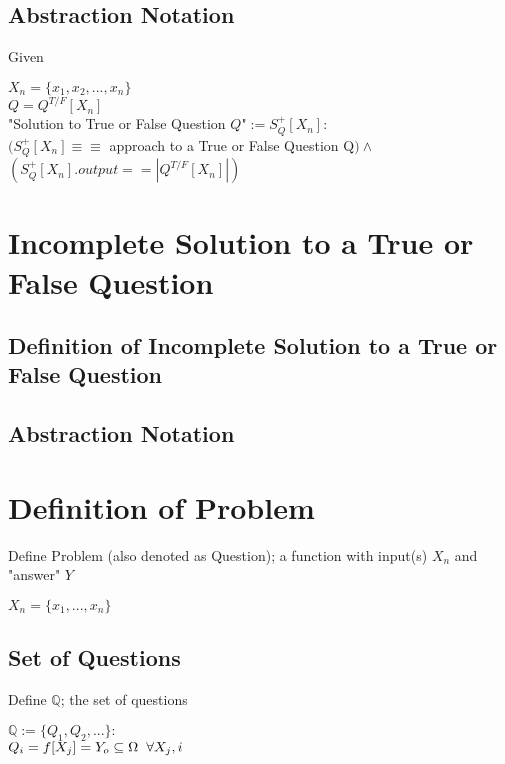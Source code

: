 \documentclass[11pt]{article}
\begin{document}
\subsection{Abstraction Notation}
Given
\begin{center}
$
X_n = \{x_1,x_2,...,x_n\}
$
\\ \vspace{2mm}
$
Q = Q^{T/F}[X_n]
$
\\ \vspace{6mm}
"Solution to True or False Question $Q$"$ := S^+_{Q}[X_n] :
$
\\ \vspace{2mm}
$
(S^+_{Q}[X_n] \equiv \equiv$ approach to a True or False Question Q$)\land
$
\\ \vspace{2mm}
$
(S^+_{Q}[X_n].output == |Q^{T/F}[X_n]|)
$
\end{center}




\section*{Incomplete Solution to a True or False Question}
\subsection{Definition of Incomplete Solution to a True or False Question}
\subsection{Abstraction Notation}


\newpage

\section{Definition of Problem}
Define Problem (also denoted as Question); a function with input(s) $X_n$ and "answer" $Y$
\begin{center}
$
X_n = \{x_1,...,x_n\}
$
\end{center}
\subsection{Set of Questions}
Define $\mathbb{Q}$; the set of questions
\begin{center}
$
\mathbb{Q} := \{Q_1,Q_2,...\}:
$
\\ \vspace{2mm}
$
Q_i = f[X_j] = Y_o \subseteq \Omega \hspace{2mm} \forall X_j, i
$
\end{center}
\end{document}
